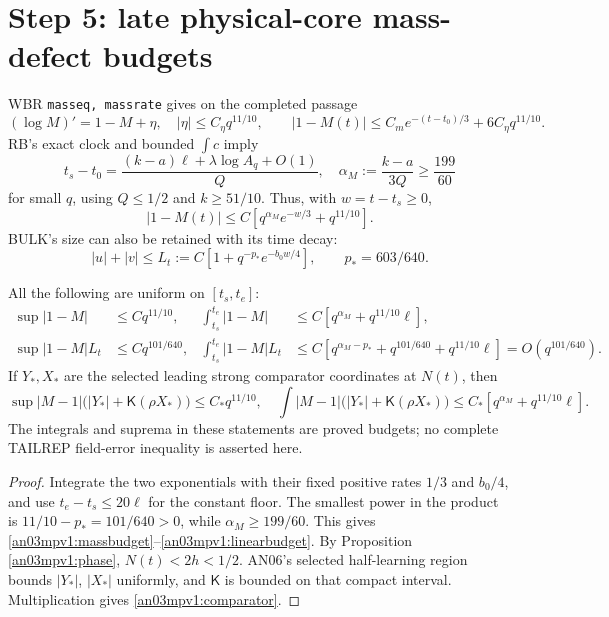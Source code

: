 \documentclass[11pt]{article}
\numberwithin{equation}{section}
\theoremstyle{remark}\newtheorem{remark}[theorem]{Remark}
\newcommand{\Kfun}{\mathsf K}
\begin{document}
\section{Step 5: late physical-core mass-defect budgets}
WBR \texttt{masseq, massrate} gives on the completed passage
\begin{equation}
 (\log M)'=1-M+\eta,\quad |\eta|\le C_\eta q^{11/10},\qquad
 |1-M(t)|\le C_me^{-(t-t_0)/3}+6C_\eta q^{11/10}.
 \label{an03mpv1:massrate}
\end{equation}
RB's exact clock and bounded $\int c$ imply
\begin{equation}
 t_s-t_0=\frac{(k-a)\ell+\lambda\log A_q+O(1)}Q,
 \quad \alpha_M:=\frac{k-a}{3Q}\ge\frac{199}{60}
 \label{an03mpv1:starttime}
\end{equation}
for small $q$, using $Q\le1/2$ and $k\ge51/10$.
Thus, with $w=t-t_s\ge0$,
\[
 |1-M(t)|\le C[q^{\alpha_M}e^{-w/3}+q^{11/10}].
\]
BULK's size can also be retained with its time decay:
\[
 |u|+|v|\le L_t:=C[1+q^{-p_*}e^{-b_0w/4}],
 \qquad p_*=603/640.
\]

\begin{proposition}
\label{an03mpv1:massbudgets}
All the following are uniform on $[t_s,t_e]$:
\begin{align}
 \sup|1-M|&\le Cq^{11/10},&
 \int_{t_s}^{t_e}|1-M|&\le C[q^{\alpha_M}+q^{11/10}\ell],
 \label{an03mpv1:massbudget}\\
 \sup |1-M|L_t&\le Cq^{101/640},&
 \int_{t_s}^{t_e}|1-M|L_t
 &\le C[q^{\alpha_M-p_*}+q^{101/640}+q^{11/10}\ell]
   =O(q^{101/640}).
 \label{an03mpv1:linearbudget}
\end{align}
If $Y_*,X_*$ are the selected leading strong comparator coordinates
at $N(t)$, then
\begin{equation}
 \sup |M-1|\bigl(|Y_*|+\Kfun(\rho X_*)\bigr)\le C_*q^{11/10},
 \quad
 \int |M-1|\bigl(|Y_*|+\Kfun(\rho X_*)\bigr)
       \le C_*[q^{\alpha_M}+q^{11/10}\ell].
 \label{an03mpv1:comparator}
\end{equation}
The integrals and suprema in these statements are proved budgets;
no complete TAILREP field-error inequality is asserted here.
\end{proposition}
\begin{proof}
Integrate the two exponentials with their fixed positive rates
$1/3$ and $b_0/4$, and use $t_e-t_s\le20\ell$ for the constant
floor. The smallest power in the product is
$11/10-p_*=101/640>0$, while $\alpha_M\ge199/60$.
This gives \eqref{an03mpv1:massbudget}--\eqref{an03mpv1:linearbudget}.
By Proposition \ref{an03mpv1:phase}, $N(t)<2h<1/2$.
AN06's selected half-learning region bounds $|Y_*|$, $|X_*|$
uniformly, and $\Kfun$ is bounded on that compact interval.
Multiplication gives \eqref{an03mpv1:comparator}.
\end{proof}
\end{document}
